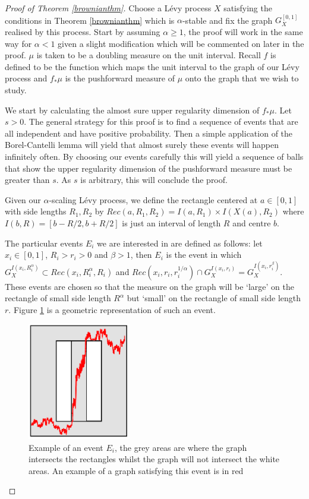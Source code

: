 \begin{proof}[Proof of Theorem \ref{brownianthm}]



Choose a L\'evy process $X$ satisfying the conditions in Theorem \ref{brownianthm} which is $\alpha$-stable and fix the graph $G_X^{[0,1]}$ realised by this process. Start by assuming $\alpha \ge 1$, the proof will work in the same way for $\alpha < 1$ given a slight modification which will be commented on later in the proof. $\mu$ is taken to be a doubling measure on the unit interval. Recall $f$ is defined to be the function which maps the unit interval to the graph of our L\'evy process and $f_*\mu$ is the pushforward measure of $\mu$ onto the graph that we wish to study.

We start by calculating the almost sure upper regularity dimension of $f_*\mu$. Let $s>0$. The general strategy for this proof is to find a sequence of events that are all independent and have positive probability. Then a simple application of the Borel-Cantelli lemma will yield that almost surely these events will happen infinitely often. By choosing our events carefully this will yield a sequence of balls that show the upper regularity dimension of the pushforward measure must be greater than $s$. As $s$ is arbitrary, this will conclude the proof.

Given our $\alpha$-scaling L\'evy process, we define the rectangle centered at $a\in [0,1]$ with side lengths $R_1,R_2$ by $Rec(a,R_1,R_2) = I(a,R_1) \times I(X(a),R_2)$ where $I(b,R) = [b-R/2,b+R/2]$ is just an interval of length $R$ and centre $b$. 

The particular events $E_i$ we are interested in are defined as follows: let $x_i \in [0,1]$, $R_i > r_i> 0$ and $\beta > 1$, then $E_i$ is the event in which $G_X^{I(x_i,R_i^{\alpha})} \subset Rec(x_i,R_i^{\alpha},R_i)$ and $Rec(x_i, r_i, r_i^{1/\alpha}) \cap G_X^{I(x_i,r_i)} = G_X^{I(x_i,r_i^{\beta})}$. These events are chosen so that the measure on the graph will be `large' on the rectangle of small side length $R^{\alpha}$ but `small' on the rectangle of small side length $r$. Figure \ref{brownian_event} is a geometric representation of such an event.  

\begin{figure}[htbp]
	\centering
	\includegraphics[width=0.4\textwidth]{pics/ch-brownian/new_rectangles.png}
	\caption{Example of an event $E_i$, the grey areas are where the graph intersects the rectangles whilst the graph will not intersect the white areas. An example of a graph satisfying this event is in red}
	\label{brownian_event}
\end{figure}


\end{proof}
